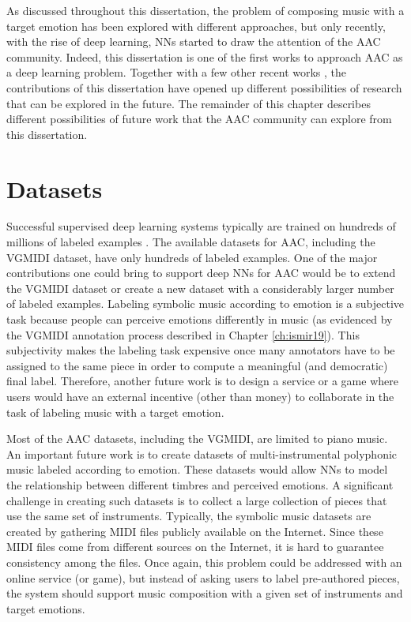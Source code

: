 As discussed throughout this dissertation, the problem of composing music with a target emotion has been explored with different approaches, but only recently, with the rise of deep learning, NNs started to draw the attention of the AAC community.  Indeed, this dissertation is one of the first works to approach AAC as a deep learning problem. Together with a few other recent works \cite{madhok2018sentimozart,tan2020automated,zhao2019emotional, tan2020music}, the contributions of this dissertation have opened up different possibilities of research that can be explored in the future. The remainder of this chapter describes different possibilities of future work that the AAC community can explore from this dissertation.

\section{Datasets}

Successful supervised deep learning systems typically are trained on hundreds of millions of labeled examples \cite{lecun2015deep}. The available datasets for AAC, including the VGMIDI dataset, have only hundreds of labeled examples. One of the major contributions one could bring to support deep NNs for AAC would be to extend the VGMIDI dataset or create a new dataset with a considerably larger number of labeled examples. Labeling symbolic music according to emotion is a subjective task because people can perceive emotions differently in music (as evidenced by the VGMIDI annotation process described in Chapter \ref{ch:ismir19}). This subjectivity makes the labeling task expensive once many annotators have to be assigned to the same piece in order to compute a meaningful (and democratic) final label. Therefore, another future work is to design a service or a game \cite{Law2007TagATuneAG} where users would have an external incentive (other than money) to collaborate in the task of labeling music with a target emotion.

Most of the AAC datasets, including the VGMIDI, are limited to piano music. An important future work is to create datasets of multi-instrumental polyphonic music labeled according to emotion. These datasets would allow NNs to model the relationship between different timbres and perceived emotions. A significant challenge in creating such datasets is to collect a large collection of pieces that use the same set of instruments. Typically, the symbolic music datasets are created by gathering MIDI files publicly available on the Internet. Since these MIDI files come from different sources on the Internet, it is hard to guarantee consistency among the files. Once again, this problem could be addressed with an online service (or game), but instead of asking users to label pre-authored pieces, the system should support music composition with a given set of instruments and target emotions.

